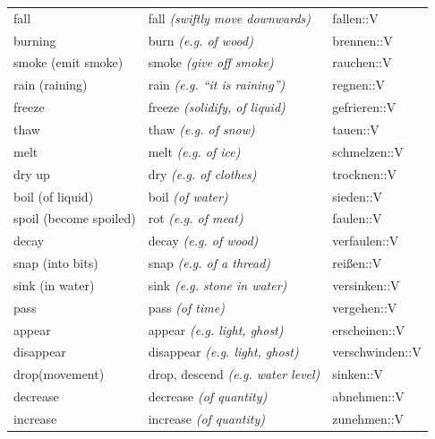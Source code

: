 \begin{center}
\begin{longtable}{lll}
{\sc \lowercase{	FALL	}}	&	fall	\textit{\footnotesize (swiftly move downwards)}	&	fallen::V	\\
{\sc \lowercase{	BURNING	}}	&	burn	\textit{\footnotesize (e.g. of wood)}	&	brennen::V	\\
{\sc \lowercase{	SMOKE \footnotesize (EMIT SMOKE)	}}	&	smoke	\textit{\footnotesize (give off smoke)}	&	rauchen::V	\\
{\sc \lowercase{	RAIN \footnotesize (RAINING)	}}	&	rain	\textit{\footnotesize (e.g. ``it is raining'')}	&	regnen::V	\\
{\sc \lowercase{	FREEZE	}}	&	freeze	\textit{\footnotesize (solidify, of liquid)}	&	gefrieren::V	\\
{\sc \lowercase{	THAW	}}	&	thaw	\textit{\footnotesize (e.g. of snow)}	&	tauen::V	\\
{\sc \lowercase{	MELT	}}	&	melt	\textit{\footnotesize (e.g. of ice)}	&	schmelzen::V	\\
{\sc \lowercase{	DRY UP	}}	&	dry	\textit{\footnotesize (e.g. of clothes)}	&	trocknen::V	\\
{\sc \lowercase{	BOIL \footnotesize (OF LIQUID)	}}	&	boil	\textit{\footnotesize (of water)}	&	sieden::V	\\
{\sc \lowercase{	SPOIL \footnotesize (BECOME SPOILED)	}}	&	rot	\textit{\footnotesize (e.g. of meat)}	&	faulen::V	\\
{\sc \lowercase{	DECAY	}}	&	decay	\textit{\footnotesize (e.g. of wood)}	&	verfaulen::V	\\
{\sc \lowercase{	SNAP \footnotesize (INTO BITS)	}}	&	snap	\textit{\footnotesize (e.g. of a thread)}	&	reißen::V	\\
{\sc \lowercase{	SINK \footnotesize (IN WATER)	}}	&	sink	\textit{\footnotesize (e.g. stone in water)}	&	versinken::V	\\
{\sc \lowercase{	PASS	}}	&	pass	\textit{\footnotesize (of time)}	&	vergehen::V	\\
{\sc \lowercase{	APPEAR	}}	&	appear	\textit{\footnotesize (e.g. light, ghost)}	&	erscheinen::V	\\
{\sc \lowercase{	DISAPPEAR	}}	&	disappear	\textit{\footnotesize (e.g. light, ghost)}	&	verschwinden::V	\\
{\sc \lowercase{	DROP\footnotesize (MOVEMENT)	}}	&	drop, descend	\textit{\footnotesize (e.g. water level)}	&	sinken::V	\\
{\sc \lowercase{	DECREASE	}}	&	decrease	\textit{\footnotesize (of quantity)}	&	abnehmen::V	\\
{\sc \lowercase{	INCREASE	}}	&	increase	\textit{\footnotesize (of quantity)}	&	zunehmen::V	\\

\end{longtable}
\end{center}

